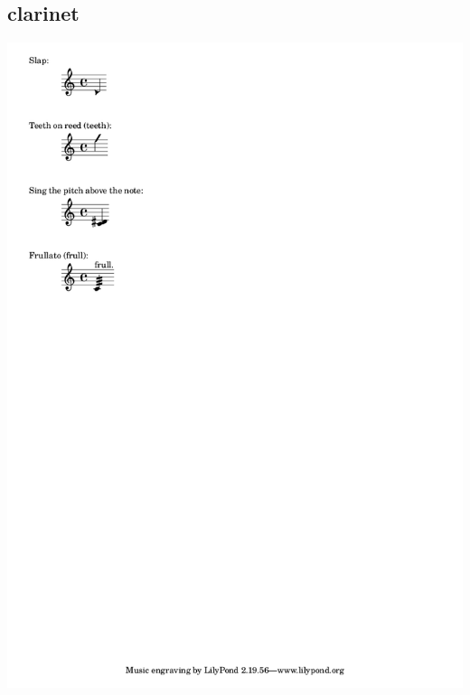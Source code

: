 \documentclass[12pt]{book}
\begin{document}
\begin{multicols}{3}
\subsection{clarinet}
\includegraphics[scale=0.7, clip, trim=0 2cm  10cm 0 ]{../../../../reference/clarinet-notation.png}

\end{multicols}
\end{document}
